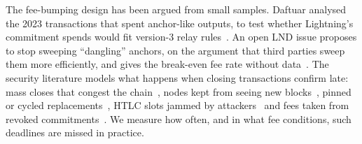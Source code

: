 The fee-bumping design has been argued from small samples. Daftuar analysed the 2023 transactions that spent
anchor-like outputs, to test whether Lightning's commitment spends would fit version-3 relay
rules~\cite{daftuar2024v3}. An open LND issue proposes to stop sweeping ``dangling'' anchors, on the argument that
third parties sweep them more efficiently, and gives the break-even fee rate without
data~\cite{lnd8997}. The security literature models what happens when closing transactions confirm late: mass closes
that congest the chain~\cite{harris2020flood,sguanci2023massexit}, nodes kept from seeing new
blocks~\cite{riard2020timedilation}, pinned or cycled
replacements~\cite{optechpinning,riard2023replacement}, HTLC slots jammed by attackers~\cite{mizrahi2021congestion}
and fees taken from revoked commitments~\cite{harding2024irrevocable}. We measure how often, and in what fee
conditions, such deadlines are missed in practice.
